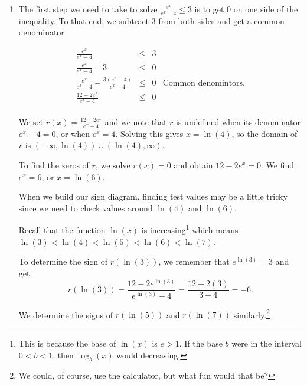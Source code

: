 \documentclass{ximera}
\begin{document}
\begin{example}
\begin{explanation}
\begin{enumerate}
\begin{center}
\end{center}

\item The first step we need to take to solve  $\frac{e^{x}}{e^{x}-4} \leq 3$ is to get $0$ on one side of the inequality. To that end, we subtract $3$ from both sides and get a common denominator


\[ \begin{array}{rclr}

\frac{e^{x}}{e^{x}-4} & \leq & 3 & \\

\frac{e^{x}}{e^{x}-4} - 3 & \leq & 0 & \\

\frac{e^{x}}{e^{x}-4} - \frac{3 \left(e^{x}-4\right)}{e^{x}-4} & \leq & 0 & \text{Common denomintors.} \\

\frac{12 - 2e^{x}}{e^{x}-4} & \leq & 0 & \\

\end{array}\]


We set $r(x) = \frac{12 - 2e^{x}}{e^{x}-4}$ and we note that $r$ is undefined when its denominator $e^{x}-4=0$, or when $e^{x} = 4$.  Solving this gives $x = \ln(4)$, so the domain of $r$ is $(-\infty, \ln(4)) \cup (\ln(4), \infty)$. 

To find the zeros of $r$, we solve $r(x) = 0$ and obtain $12 - 2e^{x} = 0$.  We find $e^{x} = 6$, or $x = \ln(6)$.  

When we build our sign diagram, finding test values may be a little tricky since we need to check values around $\ln(4)$ and $\ln(6)$.  

Recall that the function $\ln(x)$ is increasing\footnote{This is because the base of $\ln(x)$ is $e > 1$.  If the base $b$ were in the interval $0 < b < 1$, then $\log_{b}(x)$ would decreasing.} which means $\ln(3) < \ln(4) < \ln(5) < \ln(6) < \ln(7)$.  

To determine the sign of $r\left(\ln(3)\right)$, we remember that $e^{\ln(3)} = 3$ and get \[r\left(\ln(3)\right) = \frac{12 - 2e^{\ln(3)}}{e^{\ln(3)}-4} = \frac{12-2(3)}{3-4} = -6.\]  

We determine the signs of $r\left(\ln(5)\right)$ and $r\left(\ln(7)\right)$ similarly.\footnote{We could, of course, use the calculator, but what fun would that be?}   



\end{enumerate}
\end{explanation}
\end{example}
\end{document}
